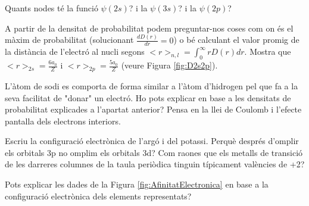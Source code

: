 \begin{exr}{}
Quants nodes té la funció $\psi(2s)$? i la $\psi(3s)$? i la $\psi(2p)$? 
\end{exr}
\begin{exr}{}{}
    A partir de la densitat de probabilitat podem preguntar-nos coses com on és el màxim de probabilitat (solucionant  $\frac{d D(r)}{dr}=0$) o bé calculant el valor promig de la distància de l'electró al nucli segons $<r>_{n,l}=\int_0^{\infty} r D(r)dr$. Mostra que $<r>_{2s}=\frac{6a_0}{Z}$ i $<r>_{2p}=\frac{5a_0}{Z}$ (veure Figura \ref{fig:D2s2p}).%
    \end{exr}
    \begin{exr}{}
        L'àtom de sodi es comporta de forma similar a l'àtom d'hidrogen pel que fa a la seva facilitat de "donar" un electró. Ho pots explicar en base a les densitats de probabilitat explicades a l'apartat anterior? Pensa en la llei de Coulomb i l'efecte pantalla dels electrons interiors.
        \end{exr}
	\begin{exr}{}
            Escriu la configuració electrònica de l'argó i del potassi. Perquè després d'omplir els orbitals 3p no omplim els orbitals 3d? Com raones que els metalls de transició de les  darreres columnes de la taula periòdica tinguin típicament valències de +2?
            \end{exr}
	    \begin{exr}{}
                Pots explicar les dades de la Figura \ref{fig:AfinitatElectronica} en base a la configuració electrònica dels elements representats?
                \end{exr}

